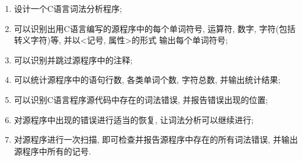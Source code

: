 \begin{enumerate}
  \item 设计一个C语言词法分析程序;
  \item 可以识别出用C语言编写的源程序中的每个单词符号, 运算符, 数字, 字符(包括转义字符)等,
  并以<记号, 属性>的形式 输出每个单词符号;
  \item 可以识别并跳过源程序中的注释;
  \item 可以统计源程序中的语句行数, 各类单词个数, 字符总数, 并输出统计结果;
  \item 可以识别C语言程序源代码中存在的词法错误, 并报告错误出现的位置;
  \item 对源程序中出现的错误进行适当的恢复, 让词法分析可以继续进行;
  \item 对源程序进行一次扫描, 即可检查并报告源程序中存在的所有词法错误, 并输出
  源程序中所有的记号.
\end{enumerate}
